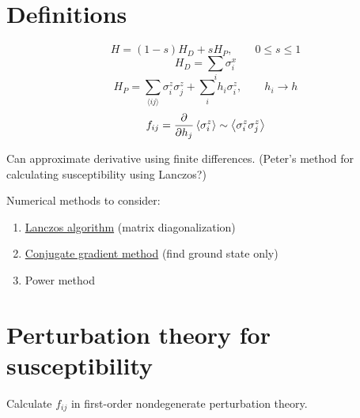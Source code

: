 %

\usepackage{hyperref}

\newcommand{\ham}{H}
\newcommand{\nnsum}[2]{\sum_{\langle #1 #2 \rangle}}
\newcommand{\cc}{\mathrm{c.c.}}
\newcommand{\nghbr}[2]{a(#1,\,#2)}



\section*{Definitions}

\begin{equation}
  \ham = (1 - s) \ham_D + s \ham_P,
  \qquad
  0 \leq s \leq 1
  \label{def-h_qaa}
\end{equation}
\begin{equation}
  \ham_D = \sum_i \sigma^x_i
  \label{def-h_d}
\end{equation}
\begin{equation}
  \ham_P = \nnsum{i}{j} \sigma^z_i \sigma^z_j + \sum_i h_i \sigma^z_i,
  \qquad
  h_i \rightarrow h
  \label{def-h_p}
\end{equation}
\begin{equation}
  f_{ij} = \frac{\partial }{\partial h_j} \left< \sigma^z_i \right>
  \sim \left< \sigma^z_i \sigma^z_j \right>
  \label{def-f}
\end{equation}

Can approximate derivative using finite differences. (Peter's method for
calculating susceptibility using Lanczos?)

Numerical methods to consider:
\begin{enumerate}
  \item \href{http://en.wikipedia.org/wiki/Lanczos_algorithm}
    {Lanczos algorithm} (matrix diagonalization)
  \item \href{http://en.wikipedia.org/wiki/Conjugate_gradient_method}
    {Conjugate gradient method} (find ground state only)
  \item Power method
\end{enumerate}

\section*{Perturbation theory for susceptibility}

Calculate $f_{ij}$ in first-order nondegenerate perturbation theory.

